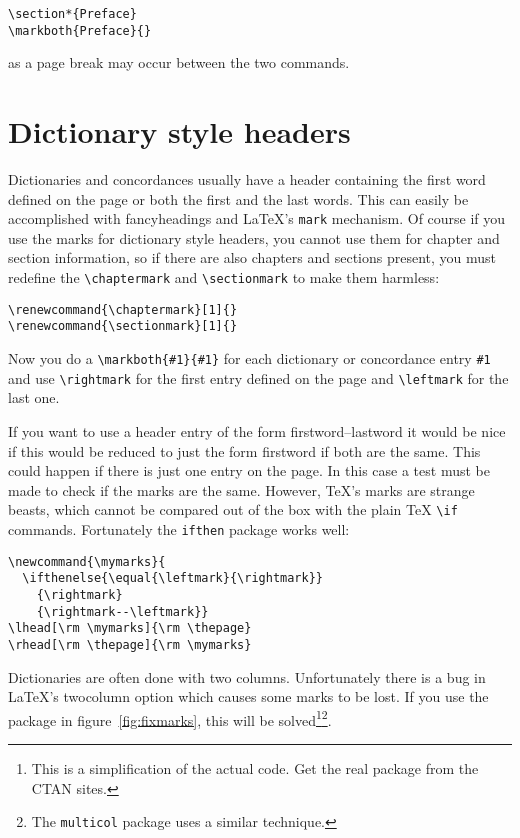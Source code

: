\documentclass[a4paper]{article}
\makeatletter
\def\latex/{\protect\LaTeX{}}
\def\tex/{\TeX}
\newcommand{\TTindex}[1]{\index{#1@\texttt{#1}}}
\makeatother
\begin{document}
\begin{verbatim}
\section*{Preface}
\markboth{Preface}{}
\end{verbatim}
as a page break may occur between the two commands.

\section{Dictionary style headers}

Dictionaries and concordances usually have a header containing the first
word defined on the page or both the first and the last words. This can
easily be accomplished with \textsf{fancyheadings} and \latex/'s
\texttt{mark} mechanism. Of course if you use the marks for dictionary
style headers, you cannot use them for chapter and section information, so
if there are also chapters and sections present, you must redefine the
\verb|\chaptermark| and \verb|\sectionmark| to make them harmless:

\begin{verbatim}
\renewcommand{\chaptermark}[1]{}
\renewcommand{\sectionmark}[1]{}
\end{verbatim}

Now you do a \verb|\markboth{#1}{#1}| for each dictionary or concordance
entry \verb|#1| and use \verb|\rightmark| for the first entry defined on
the page and \verb|\leftmark| for the last one.

If you want to use a header entry of the form \textsf{firstword--lastword}
it would be nice if this would be reduced to just the form
\textsf{firstword} if both are the same. This could happen if there is just
one entry on the page. In this case a test must be made to check if the
marks are the same.  However, \tex/'s marks are strange beasts, which
cannot be compared out of the box with the plain \tex/ \verb|\if| commands.
\TTindex{ifthen}
Fortunately the \texttt{ifthen} package works well:

\begin{verbatim}
\newcommand{\mymarks}{
  \ifthenelse{\equal{\leftmark}{\rightmark}}
    {\rightmark}
    {\rightmark--\leftmark}}
\lhead[\rm \mymarks]{\rm \thepage}
\rhead[\rm \thepage]{\rm \mymarks}
\end{verbatim}

Dictionaries are often done with two columns. Unfortunately there is a bug
in \latex/'s twocolumn option which causes some marks to be lost. If you
use the  package in figure~\ref{fig:fixmarks}, this will be
solved\footnote{This is a simplification of the  actual code. Get the real
  package from the CTAN sites.}\footnote{The
  \texttt{multicol} package uses a similar technique.}. 
\end{document}
